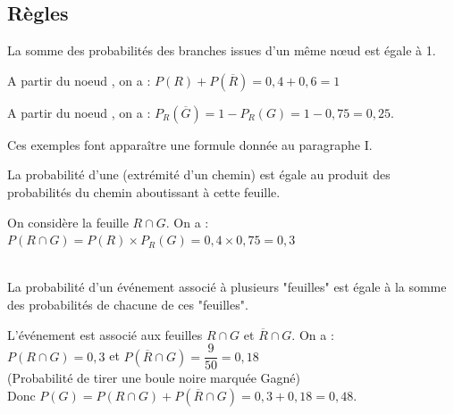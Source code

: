 \subsection{Règles}
\begin{regle}
	La somme des probabilités des branches issues d'un même nœud est égale à 1.
\end{regle}
\begin{exemples}
	\begin{itemEx}
		\item A partir du noeud , on a : $P(R)+P(\overline{R})=0,4+0,6=1$ 
		\item A partir du noeud , on a : $P_R (\overline{G})=1-P_R(G)=1-0,75=0,25$.	
	\end{itemEx}
\end{exemples}
Ces exemples font apparaître une formule donnée au paragraphe I.\\

\begin{regle}
	La probabilité d'une  (extrémité d'un chemin) est égale au produit des probabilités du chemin aboutissant à cette feuille.
\end{regle}
\begin{exemple}
	On considère la feuille $R \cap G$.
	On a :\\
	$P(R \cap G)=P(R)\times P_R (G)=0,4\times 0,75=0,3$ 
\end{exemple}

\begin{regle}
	\\
	La probabilité d'un événement associé à plusieurs "feuilles" est égale à la somme des probabilités de chacune de ces "feuilles".
\end{regle}
\begin{exemple}
	L'événement  est associé aux feuilles $R \cap G$ et $\overline R \cap G$. On a :\\
	
	$P(R \cap G)=0,3$ et 
	$P(\overline R \cap G)= \dfrac{9}{50} = 0,18$\\ (Probabilité de tirer une boule noire marquée Gagné)\\
	Donc $P(G)=P(R \cap G)+P(\overline R \cap G)=0,3+0,18=0,48$.
\end{exemple}

